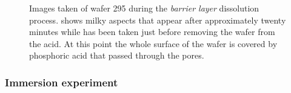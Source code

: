 \documentclass[../thesis.tex]{subfiles}
\begin{document}
          \begin{figure}[htpb]
            \centering
            \hfill
            \caption{Images taken of wafer 295 during the \textit{barrier layer} dissolution process. \protect{} shows milky aspects that appear after approximately twenty minutes while \protect{} has been taken just before removing the wafer from the acid. At this point the whole surface of the wafer is covered by phosphoric acid that passed through the pores.}
            \label{fig:barrier-layer-diss-images}
          \end{figure}


            \subsubsection{Immersion experiment}
            \label{subsec:immersion-experiment}
\end{document}
